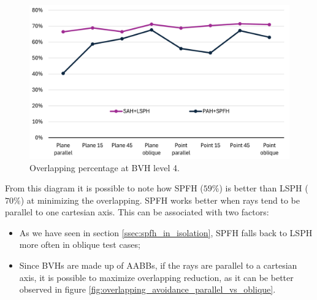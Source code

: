 \documentclass{PoliMi_MasterThesis}
\begin{document}
\begin{figure}[H] 
	\centering
	\includegraphics[width=\textwidth]{Images/siblings_overlapping_spfh_vs_lsph.png}
	\caption{Overlapping percentage at BVH level 4.}
	\label{fig:pah_overlapping_children}
\end{figure}

From this diagram it is possible to note how SPFH ($59\%$) is better than LSPH ($70\%$) at minimizing the overlapping. SPFH works better when rays tend to be parallel to one cartesian axis. This can be associated with two factors: 
\begin{itemize}
	\item As we have seen in section \ref{ssec:spfh_in_isolation}, SPFH falls back to LSPH more often in oblique test cases;
	\item Since BVHs are made up of AABBs, if the rays are parallel to a cartesian axis, it is possible to maximize overlapping reduction, as it can be better observed in figure \ref{fig:overlapping_avoidance_parallel_vs_oblique}.
\end{itemize}
\end{document}
